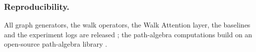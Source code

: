 \documentclass[runningheads]{llncs}
\begin{document}
\subsubsection*{Reproducibility.}
All graph generators, the walk operators, the Walk Attention layer, the
baselines and the experiment logs are released \cite{repo_walkattention}; the
path-algebra computations build on an open-source path-algebra library
\cite{repo_aiqquivers}.



\end{document}
